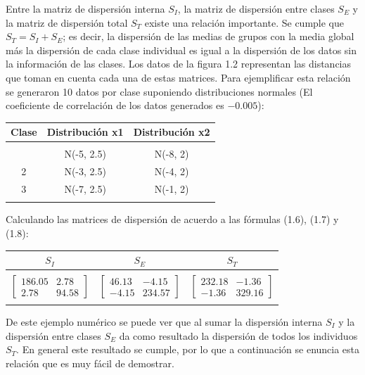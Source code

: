 Entre la matriz de dispersión interna $S_I$, la matriz de dispersión entre clases $S_E$ y la matriz de dispersión total $S_T$ existe una relación importante. Se cumple que $S_T = S_I + S_E $; es decir, la dispersión de las medias de grupos con la media global más la dispersión de cada clase individual es igual a la dispersión de los datos sin la información de las clases. Los datos de la figura 1.2 representan las distancias que toman en cuenta cada una de estas matrices. Para ejemplificar esta relación se generaron 10 datos por clase suponiendo distribuciones normales (El coeficiente de correlación de los datos generados es $-0.005$):

\begin{center}
\begin{tabular}{ c c c}
\toprule
\textbf{Clase} & \textbf{Distribución x1} & \textbf{Distribución x2} \\
\midrule\\
\addlinespace[-2ex]
1 & N(-5, 2.5) & N(-8, 2)\\
2 & N(-3, 2.5) & N(-4, 2)\\
3 & N(-7, 2.5) & N(-1, 2) \\
\addlinespace[1.5ex]
\bottomrule
\end{tabular}
\end{center}

Calculando las matrices de dispersión de acuerdo a las fórmulas (1.6), (1.7) y (1.8):

\begin{center}
\begin{tabular}{ c c c}
\toprule
\textbf{$S_I$} & \textbf{$S_E$} & \textbf{$S_T$} \\
\midrule\\
\addlinespace[-2ex]
$ \begin{bmatrix}  186.05 & 2.78 \\ 2.78 &  94.58 \end{bmatrix}$ &
$ \begin{bmatrix} 46.13 & -4.15 \\ -4.15 & 234.57 \end{bmatrix}$ &
$ \begin{bmatrix}  232.18 & -1.36 \\ -1.36 &  329.16 \end{bmatrix}$ \\
\addlinespace[1.5ex]
\bottomrule
\end{tabular}
\end{center}

De este ejemplo numérico se puede ver que al sumar la dispersión interna $S_I$ y la dispersión entre clases $S_E$ da como resultado la dispersión de todos los individuos $S_T$. En general este resultado se cumple, por lo que a continuación se enuncia esta relación que es muy fácil de demostrar.

